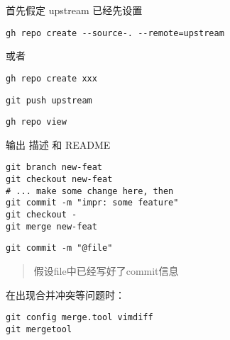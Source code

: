 
首先假定 upstream 已经先设置

\begin{lstlisting}
gh repo create --source-. --remote=upstream
\end{lstlisting}

或者

\begin{lstlisting}
gh repo create xxx
\end{lstlisting}


\begin{lstlisting}
git push upstream
\end{lstlisting}


\begin{lstlisting}
gh repo view
\end{lstlisting}

输出 描述 和 README



\begin{lstlisting}
git branch new-feat
git checkout new-feat
# ... make some change here, then
git commit -m "impr: some feature"
git checkout -
git merge new-feat
\end{lstlisting}


\begin{lstlisting}
git commit -m "@file"
\end{lstlisting}

\begin{quotation}
    假设file中已经写好了commit信息
\end{quotation}


在出现合并冲突等问题时：

\begin{lstlisting}
git config merge.tool vimdiff
git mergetool
\end{lstlisting}
